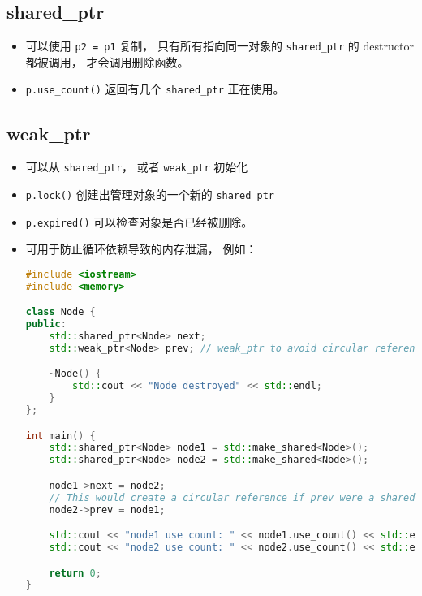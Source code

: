 \subsection{shared\_ptr}
\begin{itemize}
\item 可以使用 \verb`p2 = p1` 复制， 只有所有指向同一对象的 \verb`shared_ptr` 的 destructor 都被调用， 才会调用删除函数。
\item \verb`p.use_count()` 返回有几个 \verb`shared_ptr` 正在使用。
\end{itemize}

\subsection{weak\_ptr}
\begin{itemize}
\item 可以从 \verb`shared_ptr`， 或者 \verb`weak_ptr` 初始化
\item \verb`p.lock()` 创建出管理对象的一个新的 \verb`shared_ptr`
\item \verb`p.expired()` 可以检查对象是否已经被删除。
\item 可用于防止循环依赖导致的内存泄漏， 例如：
\begin{lstlisting}[language=cpp]
#include <iostream>
#include <memory>

class Node {
public:
    std::shared_ptr<Node> next;
    std::weak_ptr<Node> prev; // weak_ptr to avoid circular reference

    ~Node() {
        std::cout << "Node destroyed" << std::endl;
    }
};

int main() {
    std::shared_ptr<Node> node1 = std::make_shared<Node>();
    std::shared_ptr<Node> node2 = std::make_shared<Node>();

    node1->next = node2;
    // This would create a circular reference if prev were a shared_ptr
    node2->prev = node1;

    std::cout << "node1 use count: " << node1.use_count() << std::endl;  // 1
    std::cout << "node2 use count: " << node2.use_count() << std::endl;  // 2

    return 0;
}
\end{lstlisting}
\end{itemize}
